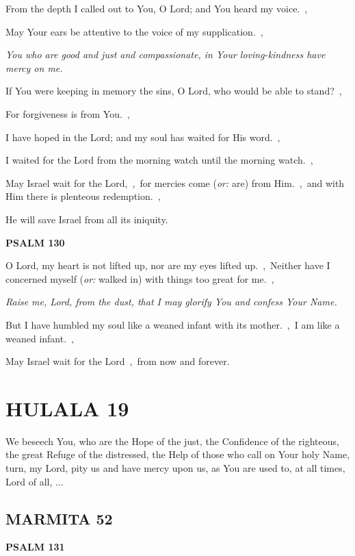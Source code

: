 \documentclass[12pt,twoside,a5paper]{article}
\newcommand{\hulala}[1]{\section*{HULALA {#1}}}
\newcommand{\marmita}[1]{\subsection*{MARMITA {#1}}}
\newcommand{\psalm}[1]{\textbf{PSALM {#1}}\nopagebreak}
\newcommand{\qanona}[1]{{\liturgicalhint{Qanona.} \emph{#1}}}
\newcommand{\slota}[1]{\liturgicalhint{Slota.} #1}
\newcommand{\translationoption}[1]{\emph{or:} #1}
\begin{document}
\begin{normalparskip}
  From the depth I called out to You, O Lord; and You heard my voice.~\sep

  May Your ears be attentive to the voice of my supplication.~\sep

  \qanona{You who are good and just and compassionate, in Your loving-kindness have mercy on me.}

  If You were keeping in memory the sins, O Lord, who would be able to stand?~\sep

  For forgiveness is from You.~\sep

  I have hoped in the Lord; and my soul has waited for His word.~\sep

  I waited for the Lord from the morning watch until the morning watch.~\sep

  May Israel wait for the Lord,~\sep\ for mercies come (\translationoption{are}) from Him.~\sep\ and with Him there is plenteous redemption.~\sep

  He will save Israel from all its iniquity.
\end{normalparskip}

\psalm{130}

\begin{normalparskip}
  O Lord, my heart is not lifted up, nor are my eyes lifted up.~\sep\ Neither have I concerned myself (\translationoption{walked in}) with things too great for me.~\sep

  \qanona{Raise me, Lord, from the dust, that I may glorify You and confess Your Name.}

  But I have humbled my soul like a weaned infant with its mother.~\sep\ I am like a weaned infant.~\sep

  May Israel wait for the Lord~\sep\ from now and forever.
\end{normalparskip}


\hulala{19}

\slota{We beseech You, who are the Hope of the just, the Confidence of the righteous, the great Refuge of the distressed, the Help of those who call on Your holy Name, turn, my Lord, pity us and have mercy upon us, as You are used to, at all times, Lord of all, ...}

\marmita{52}

\psalm{131}
\end{document}
